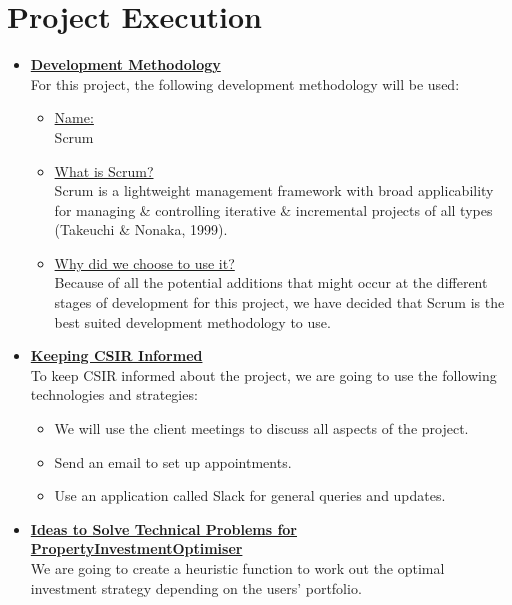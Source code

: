 \documentclass[a4paper,12pt]{article}
\begin{document}
\newpage

\section{Project Execution}

\begin{itemize}
\item {\large \underline{\textbf{Development Methodology}}}\\[0.2cm]
For this project, the following development methodology will be used:

	\begin{itemize}
 		\item \underline{Name:}
		\\[0.1cm]
		 Scrum
		\item  \underline{What is Scrum?}
		\\[0.1cm]
		Scrum is a lightweight management framework with broad applicability for managing \& controlling iterative \& 				incremental projects of all types (Takeuchi \& Nonaka, 1999).
		\item \underline{Why did we choose to use it?}
		\\[0.1cm]
		Because of all the potential additions that might occur at the different stages of development for this project, we 			have decided that Scrum is the best suited development methodology to use.
	\end{itemize}
\bigskip

\item {\large \underline{\textbf{Keeping CSIR Informed}}}\\[0.2cm]
To keep CSIR informed about the project, we are going to use the following technologies and strategies:

	\begin{itemize}
	\item We will use the client meetings to discuss all aspects of the project.
	\item Send an email to set up appointments.
	\item Use an application called Slack for general queries and updates.
	\end{itemize} 

\bigskip
\item {\large \underline{\textbf{Ideas to Solve Technical Problems for PropertyInvestmentOptimiser}}}\\[0.2cm]
We are going to create a heuristic function to work out the optimal investment strategy depending on the users’ portfolio. 
	\begin{itemize}


\end{itemize}
\end{itemize}
\end{document}
